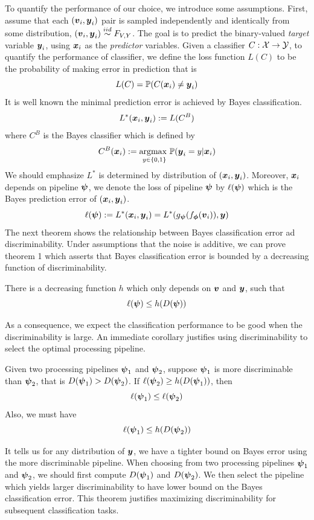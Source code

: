 \documentclass{article}
\begin{document}
To quantify the performance of our choice, we introduce some assumptions.  First, assume that each $(\boldsymbol{v}_i,\boldsymbol{y}_i)$ pair is sampled independently and identically from some distribution, $(\boldsymbol{v}_i,\boldsymbol{y}_i) \overset{iid}{\sim} F_{V,Y}$. The goal is to predict the binary-valued \emph{target} variable $\boldsymbol{y}_i$,  using $\boldsymbol{x}_i$ as the \emph{predictor} variables. Given a classifier $C: \mathcal{X} \rightarrow \mathcal{Y}$, to quantify the performance of classifier, we define the loss function $L(C)$ to be the probability of making error in prediction that is
\[L(C) = \mathbb{P}(C(\boldsymbol{x}_i) \neq \boldsymbol{y}_i) \]
It is well known the minimal prediction error is achieved by Bayes classification.
\[L^*(\boldsymbol{x}_i,\boldsymbol{y}_i) : = L(C^B)\]
where $C^{B}$ is the Bayes classifier which is defined by
\[C^{B}(\boldsymbol{x}_i):= \underset{y \in \{0,1\} }{\text{argmax }} \mathbb{P}(\boldsymbol{y}_i=y|\boldsymbol{x}_i)\] 
We should emphasize $L^*$ is determined by distribution of $(\boldsymbol{x}_i, \boldsymbol{y}_i)$. Moreover, $\boldsymbol{x}_i$ depends on pipeline $\boldsymbol{\psi}$, we denote the loss of pipeline $\boldsymbol{\psi}$ by $\ell(\boldsymbol{\psi})$ which is the Bayes prediction error of $(\boldsymbol{x}_i, \boldsymbol{y}_i)$.
\[\ell(\boldsymbol{\psi}):= L^*(\boldsymbol{x}_i,\boldsymbol{y}_i) = L^*(g_{\boldsymbol{\psi}} (f_{\boldsymbol{\phi}} (\boldsymbol{v}_i) ),\boldsymbol{y}) \] 
The next theorem shows the relationship between Bayes classification error ad discriminability. Under assumptions that the noise is additive, we can prove theorem 1 which asserts that Bayes classification error is bounded by a decreasing function of discriminability. 
\begin{thm}	
There is a decreasing function $h$ which only depends on $\boldsymbol{v}$ and $\boldsymbol{y}$, such that
\[\ell(\boldsymbol{\psi}) \leq h(D(\boldsymbol{\psi})) \]
\end{thm}
As a consequence, we expect the classification performance to be good when the discriminability is large. An immediate corollary justifies using discriminability to select the optimal processing pipeline. 
\begin{coro}	
Given two processing pipelines $\boldsymbol{\psi}_1$ and $\boldsymbol{\psi}_2$, suppose $\boldsymbol{\psi}_1$ is more discriminable than $\boldsymbol{\psi}_2$, that is $D(\boldsymbol{\psi}_1) > D(\boldsymbol{\psi}_2)$. If $\ell(\boldsymbol{\psi}_2) \geq h(D(\boldsymbol{\psi}_1))$, then
\[ \ell(\boldsymbol{\psi}_1) \leq \ell(\boldsymbol{\psi}_2) \] 
Also, we must have
\[ \ell(\boldsymbol{\psi}_1) \leq h(D(\boldsymbol{\psi}_2)) \]

\end{coro}
It tells us for any distribution of $\boldsymbol{y}$, we have a tighter bound on Bayes error using the more discriminable pipeline. When choosing from two processing pipelines $\boldsymbol{\psi}_1$ and $\boldsymbol{\psi}_2$, we should first compute $D(\boldsymbol{\psi}_1)$ and $D(\boldsymbol{\psi}_2)$. We then select the pipeline which yields larger discriminability to have lower bound on the Bayes classification error. This theorem justifies maximizing discriminability for subsequent classification tasks.
\end{document}
